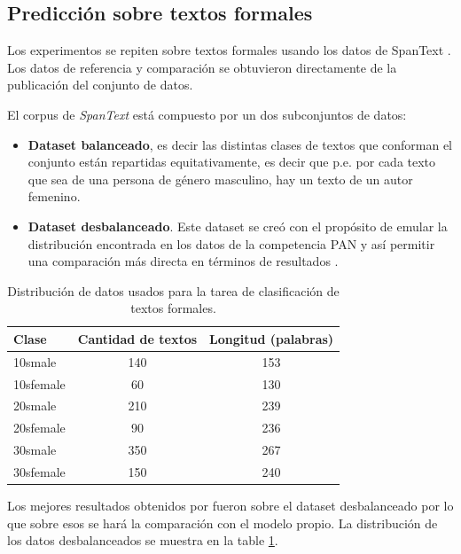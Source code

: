 \subsection{Predicción sobre textos formales}

Los experimentos se repiten sobre textos formales usando los datos de SpanText \parencite{villegas:2014:CACIC}. Los datos de referencia y comparación se obtuvieron directamente de la publicación del conjunto de datos.

El corpus de \textit{SpanText} está compuesto por un dos subconjuntos de datos:

\begin{itemize}
\item \textbf{Dataset balanceado}, es decir las distintas clases de textos que conforman el conjunto están repartidas equitativamente, es decir que p.e. por cada texto que sea de una persona de género masculino, hay un texto de un autor femenino.
\item \textbf{Dataset desbalanceado}. Este dataset se creó con el propósito de emular la distribución encontrada en los datos de la competencia PAN y así permitir una comparación más directa en términos de resultados \parencite{villegas:2014:CACIC}.
\end{itemize}

\begin{table}
\centering
\begin{tabular}{l c c}

\hline
\textbf{Clase} & \textbf{Cantidad de textos} & \textbf{Longitud (palabras)} \\
\hline
10smale & 140 & 153 \\
10sfemale & 60 & 130 \\
20smale & 210 & 239\\
20sfemale & 90 & 236 \\
30smale & 350 & 267 \\
30sfemale & 150 & 240 \\
\hline

\end{tabular}
\caption{Distribución de datos usados para la tarea de clasificación de textos formales.}
\label{tab:spantextdist}
\end{table}

Los mejores resultados obtenidos por \citeauthor{villegas:2014:CACIC} fueron sobre el dataset desbalanceado por lo que sobre esos se hará la comparación con el modelo propio. La distribución de los datos desbalanceados se muestra en la table \ref{tab:spantextdist}.

